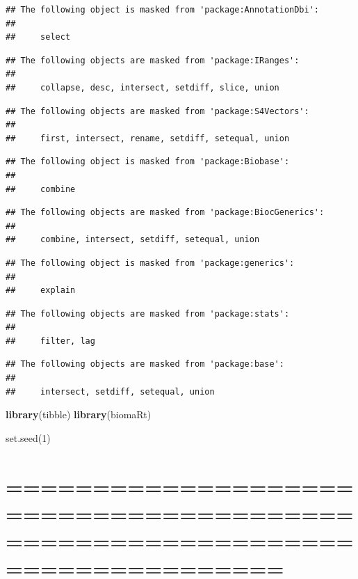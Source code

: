 \documentclass[
]{article}
\newenvironment{Shaded}{\begin{snugshade}}{\end{snugshade}}
\newcommand{\FunctionTok}[1]{\textcolor[rgb]{0.13,0.29,0.53}{\textbf{#1}}}
\newcommand{\NormalTok}[1]{#1}
\begin{document}
\begin{verbatim}
## The following object is masked from 'package:AnnotationDbi':
## 
##     select
\end{verbatim}

\begin{verbatim}
## The following objects are masked from 'package:IRanges':
## 
##     collapse, desc, intersect, setdiff, slice, union
\end{verbatim}

\begin{verbatim}
## The following objects are masked from 'package:S4Vectors':
## 
##     first, intersect, rename, setdiff, setequal, union
\end{verbatim}

\begin{verbatim}
## The following object is masked from 'package:Biobase':
## 
##     combine
\end{verbatim}

\begin{verbatim}
## The following objects are masked from 'package:BiocGenerics':
## 
##     combine, intersect, setdiff, setequal, union
\end{verbatim}

\begin{verbatim}
## The following object is masked from 'package:generics':
## 
##     explain
\end{verbatim}

\begin{verbatim}
## The following objects are masked from 'package:stats':
## 
##     filter, lag
\end{verbatim}

\begin{verbatim}
## The following objects are masked from 'package:base':
## 
##     intersect, setdiff, setequal, union
\end{verbatim}

\begin{Shaded}
\begin{Highlighting}[]
\FunctionTok{library}\NormalTok{(tibble)}
\FunctionTok{library}\NormalTok{(biomaRt)   }
\end{Highlighting}
\end{Shaded}

set.seed(1)

\section{============================================================================}\label{section-3}
\end{document}
